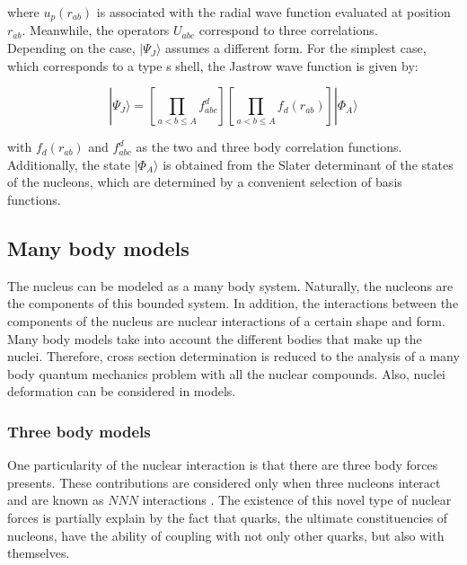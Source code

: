 \documentclass[openany]{book}
\begin{document}
where $u_{p}(r_{ab})$ is associated with the radial wave function evaluated at position $r_{ab}$. Meanwhile, the operators $U_{abc}$ correspond to three correlations.  \\

Depending on the case, $|\Psi_J \rangle$ assumes a different form. For the simplest case, which corresponds to a type s shell, the Jastrow wave function is given by:

\begin{equation}\label{eq:micro_modernTheories_variationalMonteCarlo_Jastrow}
	| \Psi_J \rangle  = \left[ \prod_{a < b \le A }{f^{d}_{abc}} \right] \left[ \prod_{a < b \le A }{f_d(r_{ab})} \right] |\Phi_A \rangle
\end{equation}

with $f_d(r_{ab})$ and $f^{d}_{abc}$ as the two and three body correlation functions. Additionally, the state $|\Phi_A \rangle$ is obtained from the Slater determinant of the states of the nucleons, which are determined by a convenient selection of basis functions.  \\

\subsection{Many body models}  \label{sub:microscopical_manybody}

The nucleus can be modeled as a many body system. Naturally, the nucleons are the components of this bounded system. In addition, the interactions between the components of the nucleus are nuclear interactions of a certain shape and form.  Many body models take into account the different bodies that make up the nuclei. Therefore, cross section determination is reduced to the analysis of a many body quantum mechanics problem with all the nuclear compounds. Also, nuclei deformation can be considered in models. \\

\subsubsection{Three body models}

One particularity of the nuclear interaction is that there are three body forces presents.  These contributions are considered only when three nucleons interact and are known as $NNN$ interactions  \cite{grigorenko_danilin_efros_shulgina_zhukov_1998}. The existence of this novel type of nuclear forces is partially explain by the fact that quarks, the ultimate constituencies of nucleons, have the ability of coupling with not only other quarks, but also with themselves. \\
\end{document}

